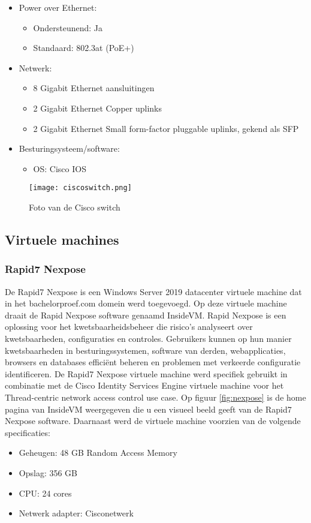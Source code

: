 \begin{itemize}
	\item Power over Ethernet:
	\begin{itemize}
		\item Ondersteunend: Ja
		\item Standaard: 802.3at (PoE+)
	\end{itemize}
	\item Netwerk:
	\begin{itemize}
		\item 8 Gigabit Ethernet aansluitingen
		\item 2 Gigabit Ethernet Copper uplinks
		\item 2 Gigabit Ethernet Small form-factor pluggable uplinks, gekend als SFP
	\end{itemize}
	\item Besturingsysteem/software:
	\begin{itemize}
		\item OS: Cisco IOS
    \end{itemize}
\end{itemize}

\begin{figure}[H]
	\centering
	\texttt{[image: ciscoswitch.png]}
	\caption{Foto van de Cisco switch}
	\label{fig:switch}
\end{figure}
\newpage
\subsection{Virtuele machines}
\subsubsection{Rapid7 Nexpose}
De Rapid7 Nexpose is een Windows Server 2019 datacenter virtuele machine dat in het bachelorproef.com domein werd toegevoegd. Op deze virtuele machine draait de Rapid Nexpose software genaamd InsideVM. Rapid Nexpose is een oplossing voor het kwetsbaarheidsbeheer die risico's analyseert over kwetsbaarheden, configuraties en controles. Gebruikers kunnen op hun manier kwetsbaarheden in besturingssystemen, software van derden, webapplicaties, browsers en databases efficiënt beheren en problemen met verkeerde configuratie identificeren. De Rapid7 Nexpose virtuele machine werd specifiek gebruikt in combinatie met de Cisco Identity Services Engine virtuele machine voor het Thread-centric network access control use case. Op figuur \ref{fig:nexpose} is de home pagina van InsideVM weergegeven die u een visueel beeld geeft van de Rapid7 Nexpose software.
\newline\newline
Daarnaast werd de virtuele machine voorzien van de volgende specificaties: 
\begin{itemize}
	\item Geheugen: 48 GB Random Access Memory
	\item Opslag: 356 GB
	\item CPU: 24 cores
	\item Netwerk adapter: Cisco\textunderscore netwerk
\end{itemize}

